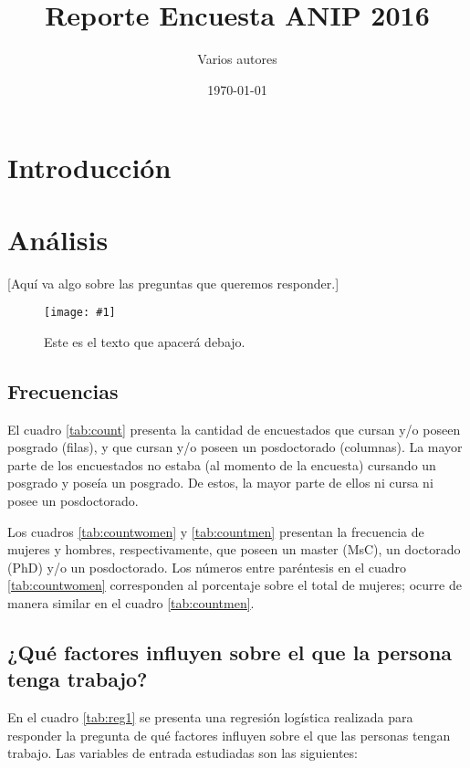 \documentclass{article}
\title{Reporte Encuesta ANIP 2016}
\author{Varios autores}
\date{\today}
\newcommand{\incluirimagen}[3]{
	\begin{figure}[h]\centering
		\texttt{[image: \#1]}
		\caption{#2}
		\label{#3}
	\end{figure}
}
\begin{document}
\maketitle

\section{Introducción}

\section{Análisis}

[Aquí va algo sobre las preguntas que queremos responder.]

\incluirimagen{placeholder.jpg}{Este es el texto que apacerá debajo.}{fig:figura}

\subsection{Frecuencias}

El cuadro \ref{tab:count} presenta la cantidad de encuestados que cursan y/o poseen posgrado (filas), y que cursan y/o poseen un posdoctorado (columnas). La mayor parte de los encuestados no estaba (al momento de la encuesta) cursando un posgrado y poseía un posgrado. De estos, la mayor parte de ellos ni cursa ni posee un posdoctorado.

Los cuadros \ref{tab:countwomen} y \ref{tab:countmen} presentan la frecuencia de mujeres y hombres, respectivamente, que poseen un master (MsC), un doctorado (PhD) y/o un posdoctorado. Los números entre paréntesis en el cuadro \ref{tab:countwomen} corresponden al porcentaje sobre el total de mujeres; ocurre de manera similar en el cuadro \ref{tab:countmen}.





\subsection{¿Qué factores influyen sobre el que la persona tenga trabajo?}


En el cuadro \ref{tab:reg1} se presenta una regresión logística realizada para responder la pregunta de qué factores influyen sobre el que las personas tengan trabajo. Las variables de entrada estudiadas son las siguientes:
\end{document}
